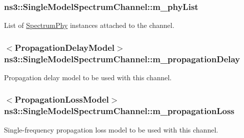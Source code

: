\subsubsection[{\texorpdfstring{m\+\_\+phy\+List}{m_phyList}}]{ ns3\+::\+Single\+Model\+Spectrum\+Channel\+::m\+\_\+phy\+List\hspace{0.3cm}{\ttfamily [private]}}\hypertarget{classns3_1_1SingleModelSpectrumChannel_a119d78d112dab0990a78599a4f2e7a9e}{}\label{classns3_1_1SingleModelSpectrumChannel_a119d78d112dab0990a78599a4f2e7a9e}
List of \hyperlink{classns3_1_1SpectrumPhy}{Spectrum\+Phy} instances attached to the channel. 
\subsubsection[{\texorpdfstring{m\+\_\+propagation\+Delay}{m_propagationDelay}}]{$<${\bf Propagation\+Delay\+Model}$>$ ns3\+::\+Single\+Model\+Spectrum\+Channel\+::m\+\_\+propagation\+Delay\hspace{0.3cm}{\ttfamily [private]}}\hypertarget{classns3_1_1SingleModelSpectrumChannel_a7149d0ddac473b3d83969ad6445a2cc6}{}\label{classns3_1_1SingleModelSpectrumChannel_a7149d0ddac473b3d83969ad6445a2cc6}
Propagation delay model to be used with this channel. 
\subsubsection[{\texorpdfstring{m\+\_\+propagation\+Loss}{m_propagationLoss}}]{$<${\bf Propagation\+Loss\+Model}$>$ ns3\+::\+Single\+Model\+Spectrum\+Channel\+::m\+\_\+propagation\+Loss\hspace{0.3cm}{\ttfamily [private]}}\hypertarget{classns3_1_1SingleModelSpectrumChannel_a9a9d930ce79583ff7b1e4a73a551765d}{}\label{classns3_1_1SingleModelSpectrumChannel_a9a9d930ce79583ff7b1e4a73a551765d}
Single-\/frequency propagation loss model to be used with this channel. 
